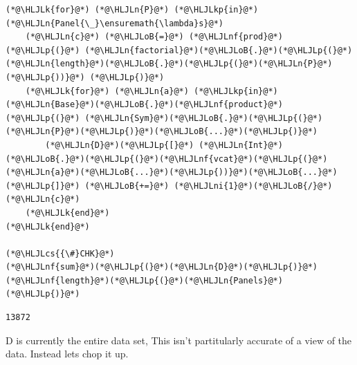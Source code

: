 \documentclass[12pt,a4paper]{article}
\newcommand{\HLJLk}[1]{\textcolor[RGB]{148,91,176}{\textbf{#1}}}
\newcommand{\HLJLkp}[1]{\textcolor[RGB]{148,91,176}{\textbf{#1}}}
\newcommand{\HLJLn}[1]{#1}
\newcommand{\HLJLnf}[1]{\textcolor[RGB]{66,102,213}{#1}}
\newcommand{\HLJLni}[1]{\textcolor[RGB]{59,151,46}{#1}}
\newcommand{\HLJLoB}[1]{\textcolor[RGB]{102,102,102}{\textbf{#1}}}
\newcommand{\HLJLp}[1]{#1}
\newcommand{\HLJLcs}[1]{\textcolor[RGB]{153,153,119}{\textit{#1}}}
\begin{document}
\begin{lstlisting}
(*@\HLJLk{for}@*) (*@\HLJLn{P}@*) (*@\HLJLkp{in}@*) (*@\HLJLn{Panel{\_}\ensuremath{\lambda}s}@*)
	(*@\HLJLn{c}@*) (*@\HLJLoB{=}@*) (*@\HLJLnf{prod}@*)(*@\HLJLp{(}@*) (*@\HLJLn{factorial}@*)(*@\HLJLoB{.}@*)(*@\HLJLp{(}@*)(*@\HLJLn{length}@*)(*@\HLJLoB{.}@*)(*@\HLJLp{(}@*)(*@\HLJLn{P}@*)(*@\HLJLp{))}@*) (*@\HLJLp{)}@*)
	(*@\HLJLk{for}@*) (*@\HLJLn{a}@*) (*@\HLJLkp{in}@*) (*@\HLJLn{Base}@*)(*@\HLJLoB{.}@*)(*@\HLJLnf{product}@*)(*@\HLJLp{(}@*) (*@\HLJLn{Sym}@*)(*@\HLJLoB{.}@*)(*@\HLJLp{(}@*)(*@\HLJLn{P}@*)(*@\HLJLp{)}@*)(*@\HLJLoB{...}@*)(*@\HLJLp{)}@*)
		(*@\HLJLn{D}@*)(*@\HLJLp{[}@*) (*@\HLJLn{Int}@*)(*@\HLJLoB{.}@*)(*@\HLJLp{(}@*)(*@\HLJLnf{vcat}@*)(*@\HLJLp{(}@*)(*@\HLJLn{a}@*)(*@\HLJLoB{...}@*)(*@\HLJLp{))}@*)(*@\HLJLoB{...}@*) (*@\HLJLp{]}@*) (*@\HLJLoB{+=}@*) (*@\HLJLni{1}@*)(*@\HLJLoB{/}@*)(*@\HLJLn{c}@*)
	(*@\HLJLk{end}@*)
(*@\HLJLk{end}@*)

(*@\HLJLcs{{\#}CHK}@*)
(*@\HLJLnf{sum}@*)(*@\HLJLp{(}@*)(*@\HLJLn{D}@*)(*@\HLJLp{)}@*)
(*@\HLJLnf{length}@*)(*@\HLJLp{(}@*)(*@\HLJLn{Panels}@*)(*@\HLJLp{)}@*)
\end{lstlisting}

\begin{lstlisting}
13872
\end{lstlisting}


D is currently the entire data set, This isn't partitularly accurate of a view of the data. Instead lets chop it up.
\end{document}
